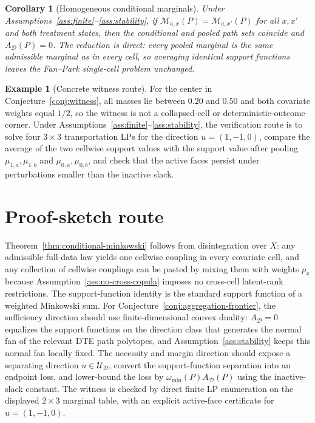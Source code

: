 \documentclass[11pt]{article}
\theoremstyle{definition}
\newtheorem{example}{Example}
\theoremstyle{plain}
\newtheorem{corollary}{Corollary}
\theoremstyle{remark}
\begin{document}
\begin{corollary}[Homogeneous conditional marginals]\label{cor:homogeneous}
Under Assumptions~\ref{ass:finite}--\ref{ass:stability}, if \(\mathcal M_{a,x}(P)=\mathcal M_{a,x'}(P)\) for all \(x,x'\) and both treatment states, then the conditional and pooled path sets coincide and \(A_{\mathcal D}(P)=0\).  The reduction is direct: every pooled marginal is the same admissible marginal as in every cell, so averaging identical support functions leaves the Fan--Park single-cell problem unchanged.
\end{corollary}

\begin{example}[Concrete witness route]\label{ex:witness-route}
For the center in Conjecture~\ref{conj:witness}, all masses lie between \(0.20\) and \(0.50\) and both covariate weights equal \(1/2\), so the witness is not a collapsed-cell or deterministic-outcome corner.  Under Assumptions~\ref{ass:finite}--\ref{ass:stability}, the verification route is to solve four \(3\times3\) transportation LPs for the direction \(u=(1,-1,0)\), compare the average of the two cellwise support values with the support value after pooling \(\mu_{1,a},\mu_{1,b}\) and \(\mu_{0,a},\mu_{0,b}\), and check that the active faces persist under perturbations smaller than the inactive slack.
\end{example}

\section{Proof-sketch route}
Theorem~\ref{thm:conditional-minkowski} follows from disintegration over \(X\): any admissible full-data law yields one cellwise coupling in every covariate cell, and any collection of cellwise couplings can be pasted by mixing them with weights \(p_x\) because Assumption~\ref{ass:no-cross-copula} imposes no cross-cell latent-rank restrictions.  The support-function identity is the standard support function of a weighted Minkowski sum.  For Conjecture~\ref{conj:aggregation-frontier}, the sufficiency direction should use finite-dimensional convex duality: \(A_{\mathcal D}=0\) equalizes the support functions on the direction class that generates the normal fan of the relevant DTE path polytopes, and Assumption~\ref{ass:stability} keeps this normal fan locally fixed.  The necessity and margin direction should expose a separating direction \(u\in\mathcal U_{\mathcal D}\), convert the support-function separation into an endpoint loss, and lower-bound the loss by \(\omega_{\min}(P)A_{\mathcal D}(P)\) using the inactive-slack constant.  The witness is checked by direct finite LP enumeration on the displayed \(2\times3\) marginal table, with an explicit active-face certificate for \(u=(1,-1,0)\).
\end{document}
